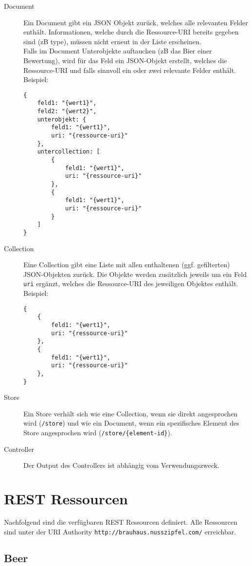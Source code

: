 \documentclass[10pt,a4paper]{scrartcl}
\begin{document}
\begin{description}
	\item[Document] Ein Document gibt ein JSON Objekt zurück, welches alle relevanten Felder enthält.
		Informationen, welche durch die Ressource-URI bereits gegeben sind (zB type), müssen nicht
		erneut in der Liste erscheinen.\\
		Falls im Document Unterobjekte auftauchen (zB das Bier einer Bewertung), wird für das Feld ein
		JSON-Objekt erstellt, welches die Ressource-URI und falls sinnvoll ein oder zwei relevante
		Felder enthält.\\
		Beispiel: \hfill
\begin{lstlisting}
{
	feld1: "{wert1}",
	feld2: "{wert2}",
	unterobjekt: {
		feld1: "{wert1}",
		uri: "{ressource-uri}"
	},
	untercollection: [
		{
			feld1: "{wert1}",
			uri: "{ressource-uri}"
		},
		{
			feld1: "{wert1}",
			uri: "{ressource-uri}"
		}
	]
}
\end{lstlisting}
	\item[Collection] Eine Collection gibt eine Liste mit allen enthaltenen (ggf. gefilterten)
		JSON-Objekten zurück. Die Objekte werden zusätzlich jeweils um ein Feld \texttt{uri} ergänzt,
		welches die Ressource-URI des jeweiligen Objektes enthält.\\
		Beispiel: \hfill
\begin{lstlisting}
{
	{
		feld1: "{wert1}",
		uri: "{ressource-uri}"
	},
	{
		feld1: "{wert1}",
		uri: "{ressource-uri}"
	},
}
\end{lstlisting}
	\item[Store] Ein Store verhält sich wie eine Collection, wenn sie direkt angesprochen wird
		(\texttt{/store}) und wie ein Document, wenn ein spezifisches Element des Store angesprochen
		wird (\texttt{/store/\{element-id\}}).
	\item[Controller] Der Output des Controllers ist abhängig vom Verwendungszweck.
\end{description}


\section{REST Ressourcen}

Nachfolgend sind die verfügbaren REST Ressourcen definiert. Alle Ressourcen sind
unter der URI Authority \texttt{http://brauhaus.nusszipfel.com/} erreichbar.


\subsection{Beer}
\end{document}
